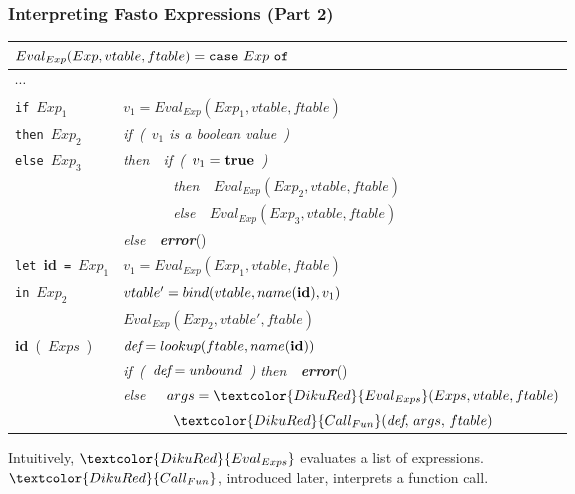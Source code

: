 \documentclass{beamer}
\newcommand{\emp}[1]{\textcolor{DikuRed}{ #1}}
\begin{document}
\begin{frame}
\frametitle{Interpreting Fasto Expressions (Part 2)}

\renewcommand{\arraystretch}{0.9}
\begin{tabular}{|l|l|}\hline
\multicolumn{2}{|l|}{$ Eval_{Exp}(Exp,vtable,ftable) =
  \mbox{\tt case}~Exp~\mbox{\tt of}$} \\\hline
$\cdots$ & \\\hline

{\tt if}~$Exp_1$
        & $v_1 = Eval_{Exp}(Exp_1,vtable,ftable)$ \\
{\tt then}~$Exp_2$
        & {\em if~(~$v_1$ is a boolean value~)} \\
{\tt else}~$Exp_3$
        & {\em then~~if~(~$v_1 = \mbox{\bf true}$~)} \\
        & {\em ~~~~~~~then~~$Eval_{Exp}(Exp_2,vtable,ftable)$} \\
        & {\em ~~~~~~~else~~$Eval_{Exp}(Exp_3,vtable,ftable)$} \\
        & {\em else~~\mbox{\bf error}}()\\\hline

{\tt let}~{\bf id}~{\tt =}~$Exp_1$
        & $v_1 = Eval_{Exp}(Exp_1,vtable,ftable)$ \\
{\tt in}~$Exp_2$
        & $vtable' = bind(vtable,name(\mbox{\bf id}),v_1)$ \\
        & $Eval_{Exp}(Exp_2,vtable',ftable)$ \\\hline

{\bf id}~(~$Exps$~)
        & $\mbox{\em def} = lookup(ftable,name(\mbox{\bf id}))$ \\
        & {\em if~(~$\mbox{\em def} = unbound$~)} {\em then~~\mbox{\bf error}}() \\
        & {\em else}~~~$args  =  \emp{Eval_{Exps}}(Exps,vtable,ftable)$ \\
        & ~~~~~~~$\emp{Call_{Fun}}(\mbox{\em def},\, args,\,ftable)$ \\\hline

\end{tabular}

\smallskip

Intuitively, $\emp{Eval_{Exps}}$ evaluates a list of expressions.\\
$\emp{Call_{Fun}}$, introduced later, interprets a function call.

\end{frame}
\end{document}
